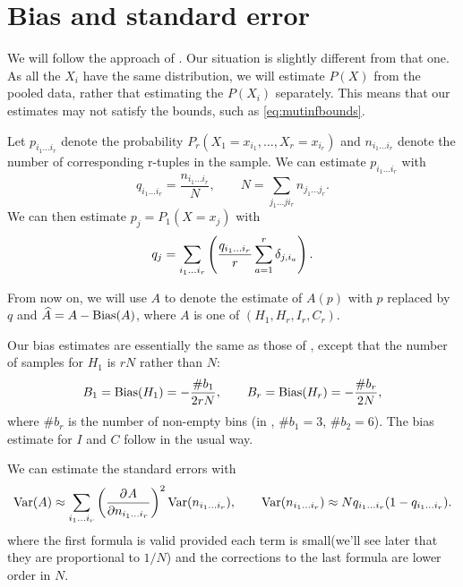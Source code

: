 \documentclass[12pt]{article}
\begin{document}
\section{Bias and standard error}\label{sec:stderr}

We will follow the approach of \cite{1999PhyD..125..285R}. Our situation is slightly different from that one. As all the $X_i$ have the same distribution, we will estimate $P(X)$ from the pooled data, rather that estimating the $P(X_i)$ separately. This means that our estimates may not satisfy the bounds, such as \eqref{eq:mutinfbounds}.

Let $p_{i_1\ldots i_r}$ denote the probability $P_r(X_1=x_{i_1},\ldots,X_r=x_{i_r})$ and $n_{i_1\ldots i_r}$ denote the number of corresponding r-tuples in the sample. We can estimate $p_{i_1\ldots i_r}$ with
%
\begin{equation}\label{eq:tupprob}
  q_{i_1\ldots i_r} = \frac{n_{i_1\ldots i_r}}{N},
  \qquad
  N = \sum_{j_1\ldots ji_r} n_{j_1\ldots j_r}.
\end{equation}
%
We can then estimate $p_{j}=P_1(X=x_{j})$ with
%
\begin{equation}\label{eq:singprob}
  q_j = \sum_{i_1\ldots i_r}\left (  \frac{q_{i_1\ldots i_r}}{r} \sum_{a=1}^r \delta_{j,i_a} \right ).
\end{equation}
%

From now on, we will use $A$ to denote the estimate of $A(p)$ with $p$ replaced by $q$ and $\widehat{A}=A-\operatorname{Bias}(A)$, where $A$ is one of $(H_1,H_r,I_r,C_r)$.

Our bias estimates are essentially the same as those of \cite{1999PhyD..125..285R}, except that the number of samples for $H_1$ is $rN$ rather than $N$:
%
\begin{equation}\label{eq:biasH}
  B_1 = \operatorname{Bias}(H_1) = -\frac{\#b_1}{2rN},
  \qquad
  B_r = \operatorname{Bias}(H_r) = -\frac{\#b_r}{2N},
\end{equation}
%
where $\#b_r$ is the number of non-empty bins (\eg in , $\#b_1=3$, $\#b_2=6$). The bias estimate for $I$ and $C$ follow in the usual way.

We can estimate the standard errors with
%
\begin{equation}\label{eq:stderr}
  \var(A) \approx \sum_{i_1\ldots i_r} \prn{\pdiff{A}{n_{i_1\ldots i_r}}}^2 \var(n_{i_1\ldots i_r}),
  \qquad
  \var(n_{i_1\ldots i_r}) \approx N q_{i_1\ldots i_r}(1-q_{i_1\ldots i_r}).
\end{equation}
%
where the first formula is valid provided each term is small(we'll see later that they are proportional to $1/N$) and the corrections to the last formula are lower order in $N$.
\end{document}
